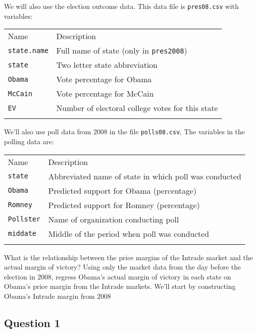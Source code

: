 \documentclass[]{article}
\begin{document}
We will also use the election outcome data. This data file is
\texttt{pres08.csv} with variables:

\begin{longtable}[c]{@{}ll@{}}
\toprule\addlinespace
Name & Description
\\\addlinespace
\midrule\endhead
\texttt{state.name} & Full name of state (only in \texttt{pres2008})
\\\addlinespace
\texttt{state} & Two letter state abbreviation
\\\addlinespace
\texttt{Obama} & Vote percentage for Obama
\\\addlinespace
\texttt{McCain} & Vote percentage for McCain
\\\addlinespace
\texttt{EV} & Number of electoral college votes for this state
\\\addlinespace
\bottomrule
\end{longtable}

We'll also use poll data from 2008 in the file \texttt{polls08.csv}, The
variables in the polling data are:

\begin{longtable}[c]{@{}ll@{}}
\toprule\addlinespace
Name & Description
\\\addlinespace
\midrule\endhead
\texttt{state} & Abbreviated name of state in which poll was conducted
\\\addlinespace
\texttt{Obama} & Predicted support for Obama (percentage)
\\\addlinespace
\texttt{Romney} & Predicted support for Romney (percentage)
\\\addlinespace
\texttt{Pollster} & Name of organization conducting poll
\\\addlinespace
\texttt{middate} & Middle of the period when poll was conducted
\\\addlinespace
\bottomrule
\end{longtable}

What is the relationship between the price margins of the Intrade market
and the actual margin of victory? Using only the market data from the
day before the election in 2008, regress Obama's actual margin of
victory in each state on Obama's price margin from the Intrade markets.
We'll start by constructing Obama's Intrade margin from 2008

\subsection{Question 1}\label{question-1}
\end{document}
